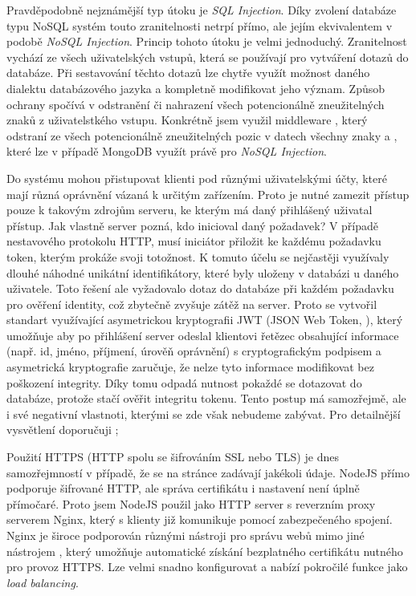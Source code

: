 Pravděpodobně nejznámější typ útoku je \textit{SQL Injection}. Díky zvolení databáze typu NoSQL systém touto zranitelnosti netrpí přímo, ale jejím ekvivalentem v podobě \textit{NoSQL Injection}. Princip tohoto útoku je velmi jednoduchý. Zranitelnost vychází ze všech uživatelských vstupů, která se používají pro vytváření dotazů do databáze. Při sestavování těchto dotazů lze chytře využít možnost daného dialektu databázového jazyka a kompletně modifikovat jeho význam. Způsob ochrany spočívá v odstranění či nahrazení všech potencionálně zneužitelných znaků z uživatelstkého vstupu. Konkrétně jsem využil middleware , který odstraní ze všech potencionálně zneužitelných pozic v datech všechny znaky \uv{\$} a , které lze v případě MongoDB využít právě pro \textit{NoSQL Injection}.

Do systému mohou přistupovat klienti pod různými uživatelskými účty, které mají různá oprávnění vázaná k určitým zařízením. Proto je nutné zamezit přístup pouze k takovým zdrojům serveru, ke kterým má daný přihlášený uživatal přístup. Jak vlastně server pozná, kdo inicioval daný požadavek? V případě nestavového protokolu HTTP, musí iniciátor přiložit ke každému požadavku token, kterým prokáže svoji totožnost. K tomuto účelu se nejčastěji využívaly dlouhé náhodné unikátní identifikátory, které byly uloženy v databázi u daného uživatele. Toto řešení ale vyžadovalo dotaz do databáze při každém požadavku pro ověření identity, což zbytečně zvyšuje zátěž na server. Proto se vytvořil standart využívající asymetrickou kryptografii JWT (JSON Web Token, \cite[RFC 7519]{rfc-jwt}), který umožňuje aby po přihlášení server odeslal klientovi řetězec obsahující informace (např. id, jméno, příjmení, úrověň oprávnění) s cryptografickým podpisem a asymetrická kryptografie zaručuje, že nelze tyto informace modifikovat bez poškození integrity. Díky tomu odpadá nutnost pokaždé se dotazovat do databáze, protože stačí ověřit integritu tokenu. Tento postup má samozřejmě, ale i své negativní vlastnoti, kterými se zde však nebudeme zabývat. Pro detailnější vysvětlení doporučuji \cite{jwt-cons};

Použití HTTPS (HTTP spolu se šifrováním SSL nebo TLS) je dnes samozřejmností v případě, že se na stránce zadávají jakékoli údaje. NodeJS přímo podporuje šifrované HTTP, ale správa certifikátu i nastavení není úplně přímočaré. Proto jsem NodeJS použil jako HTTP server s reverzním proxy serverem Nginx, který s klienty již komunikuje pomocí zabezpečeného spojení. Nginx je široce podporován různými nástroji pro správu webů mimo jiné nástrojem , který umožňuje automatické získání bezplatného certifikátu nutného pro provoz HTTPS. Lze velmi snadno konfigurovat a nabízí pokročilé funkce jako \textit{load balancing}.

